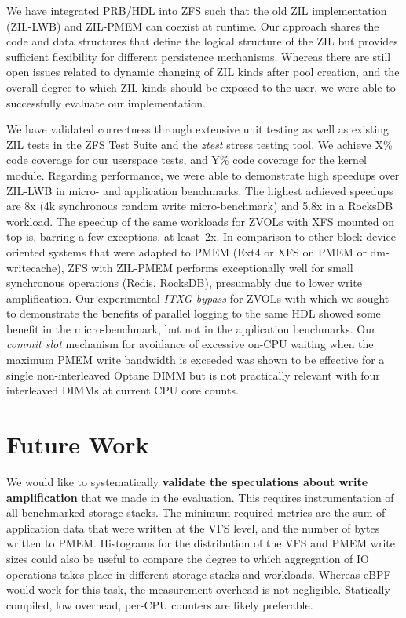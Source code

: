 \documentclass[12pt,a4paper,twoside]{book}
\begin{document}
We have integrated PRB/HDL into ZFS such that the old ZIL implementation (ZIL-LWB) and ZIL-PMEM can coexist at runtime.
Our approach shares the code and data structures that define the logical structure of the ZIL but provides sufficient flexibility for different persistence mechanisms.
Whereas there are still open issues related to dynamic changing of ZIL kinds after pool creation, and the overall degree to which ZIL kinds should be exposed to the user, we were able to successfully evaluate our implementation.

We have validated correctness through extensive unit testing as well as existing ZIL tests in the ZFS Test Suite and the \textit{ztest} stress testing tool.
We achieve X\% code coverage for our userspace tests, and Y\% code coverage for the kernel module.
Regarding performance, we were able to demonstrate high speedups over ZIL-LWB in micro- and application benchmarks.
The highest achieved speedups are 8x (4k synchronous random write micro-benchmark) and 5.8x in a RocksDB workload.
The speedup of the same workloads for ZVOLs with XFS mounted on top is, barring a few exceptions, at least~2x.
In comparison to other block-device-oriented systems that were adapted to PMEM (Ext4 or XFS on PMEM or dm-writecache), ZFS with ZIL-PMEM performs exceptionally well for small synchronous operations (Redis, RocksDB), presumably due to lower write amplification.
Our experimental \textit{ITXG bypass} for ZVOLs with which we sought to demonstrate the benefits of parallel logging to the same HDL showed some benefit in the micro-benchmark, but not in the application benchmarks.
Our \textit{commit slot} mechanism for avoidance of excessive on-CPU waiting when the maximum PMEM write bandwidth is exceeded was shown to be effective for a single non-interleaved Optane DIMM but is not practically relevant with four interleaved DIMMs at current CPU core counts.

\section{Future Work}\label{sec:futurework}

We would like to systematically \textbf{validate the speculations about write amplification} that we made in the evaluation.
This requires instrumentation of all benchmarked storage stacks.
The minimum required metrics are the sum of application data that were written at the VFS level, and the number of bytes written to PMEM.
Histograms for the distribution of the VFS and PMEM write sizes could also be useful to compare the degree to which aggregation of IO operations takes place in different storage stacks and workloads.
Whereas eBPF would work for this task, the measurement overhead is not negligible.
Statically compiled, low overhead, per-CPU counters are likely preferable.
\end{document}
